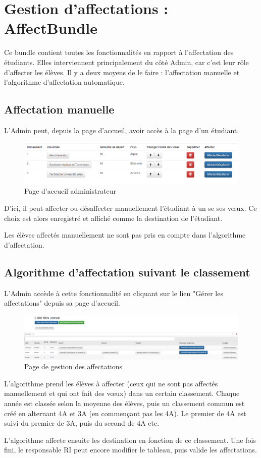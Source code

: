 \chapter{Gestion d'affectations : AffectBundle}

Ce bundle contient toutes les fonctionnalités en rapport à l'affectation des étudiants.
Elles interviennent principalement du côté Admin, car c'est leur rôle d'affecter les élèves. Il y a deux moyens de le faire : l'affectation manuelle et l'algorithme d'affectation automatique.

\section{Affectation manuelle}

L'Admin peut, depuis la page d'accueil, avoir accès à la page d'un étudiant. 
 \bigbreak
 \begin{figure}[H]
	\centering
 \includegraphics[scale=0.5]{images/voeux_etud_vupar_admin.PNG}
	\caption{Page d'accueil administrateur}
	\label{gm}
\end{figure}
 
\bigbreak
D'ici, il peut affecter ou désaffecter manuellement l'étudiant à un se ses vœux.
Ce choix est alors enregistré et affiché comme la destination de l'étudiant.

Les élèves affectés manuellement ne sont pas pris en compte dans l'algorithme d'affectation.

\section{Algorithme d'affectation suivant le classement}

L'Admin accède à cette fonctionnalité en cliquant sur le lien "Gérer les affectations" depuis sa page d'accueil.
\bigbreak
\begin{figure}[H]
	\centering
	\includegraphics[scale=0.22]{images/Liste_de_voeux_admin.PNG}
	\caption{Page de gestion des affectations}
	\label{ga}
\end{figure}
\bigbreak
L'algorithme prend les élèves à affecter (ceux qui ne sont pas affectés manuellement et qui ont fait des vœux) dans un certain classement. Chaque année est classée selon la moyenne des élèves, puis un classement commun est créé en alternant 4A et 3A (en commençant pas les 4A). Le premier de 4A est suivi du premier de 3A, puis du second de 4A etc.

L'algorithme affecte ensuite les destination en fonction de ce classement.
Une fois fini, le responsable RI peut encore modifier le tableau, puis valide les affectations.

